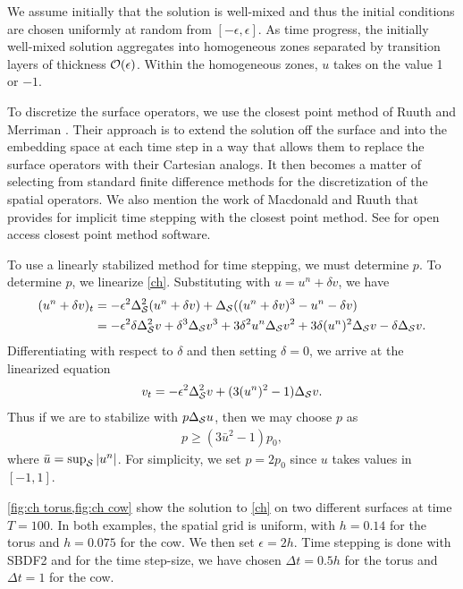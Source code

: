 We assume initially that the solution is well-mixed and thus the initial conditions are chosen uniformly at random from $[-\epsilon,\epsilon]$. As time progress, the initially well-mixed solution aggregates into homogeneous zones separated by transition layers of thickness $\O(\epsilon)$. Within the homogeneous zones, $u$ takes on the value 1 or $-1$. 

To discretize the surface operators, we use the closest point method of Ruuth and Merriman \cite{ruuth2008simple}. Their approach is to extend the solution off the surface and into the embedding space at each time step in a way that allows them to replace the surface operators with their Cartesian analogs. It then becomes a matter of selecting from standard finite difference methods for the discretization of the spatial operators. We also mention the work of Macdonald and Ruuth \cite{macdonald2009implicit} that provides for implicit time stepping with the closest point method. See \cite{cpmcodes} for open access closest point method software.

To use a linearly stabilized method for time stepping, we must determine $p$. To determine $p$, we linearize \cref{ch}. Substituting with $u = u^n + \delta v$, we have 
\begin{align}
\begin{split} 
(u^n + \delta v)_t 
&= -\epsilon^2\Delta_\S^2 (u^n + \delta v) 
+ \Delta_\S((u^n + \delta v)^3 - u^n - \delta v) 
\\
&= -\epsilon^2\delta\Delta_\S^2 v
+ \delta^3\Delta_\S v^3 + 3\delta^2u^n \Delta_\S v^2 + 3\delta (u^n)^2 \Delta_\S v - \delta \Delta_\S v. 
\end{split} 
\label{ch linearize}
\end{align}
Differentiating with respect to $\delta$ and then setting $\delta = 0$, we arrive at the linearized equation 
\begin{align}
v_t = -\epsilon^2\Delta_\S^2 v + (3(u^n)^2-1) \Delta_\S v. 
\end{align}
Thus if we are to stabilize with $p\Delta_\S u$, then we may choose $p$ as 
\begin{align}
p \geq (3\bar u^2 - 1)p_0, 
\end{align}
where $\bar u = \sup_\S \abs{u^n}$. For simplicity, we set $p=2p_0$ since $u$ takes values in $[-1,1]$.  

\cref{fig:ch torus,fig:ch cow} show the solution to \cref{ch} on two different surfaces at time $T=100$. In both examples, the spatial grid is uniform, with $h=0.14$ for the torus and $h=0.075$ for the cow. We then set $\epsilon=2h$. Time stepping is done with SBDF2 and for the time step-size, we have chosen $\Delta t = 0.5h$ for the torus and $\Delta t = 1$ for the cow. 

